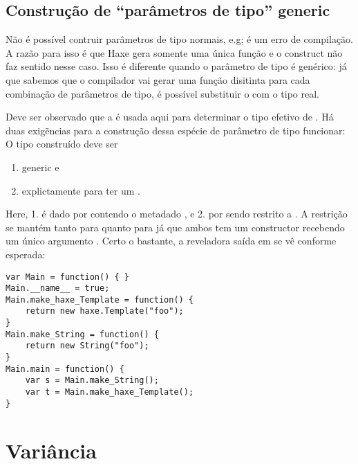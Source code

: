 \subsection{Construção de ``parâmetros de tipo'' generic}
\label{type-system-generic-type-parameter-construction}


Não é possível contruir parâmetros de tipo normais, e.g;  é um erro de compilação. A razão para isso é que Haxe gera somente uma única função e o construct não faz sentido nesse caso. Isso é diferente quando o parâmetro de tipo é genérico: já que sabemos que o compilador vai gerar uma função disitinta para cada combinação de parâmetros de tipo, é possível substituir o   com o tipo real.


Deve ser observado que a  é usada aqui para determinar o tipo efetivo de . Há duas exigẽncias para a construção dessa espécie de parâmetro de tipo funcionar: O tipo construído deve ser

\begin{enumerate}
	\item generic e 
	\item explictamente  para ter um .
\end{enumerate}

Here, 1. é dado por  contendo o metadado , e 2. por  sendo restrito a . A restrição se mantém tanto para  quanto para  já que ambos tem um constructor recebendo um único argumento . Certo o bastante, a reveladora saída em   se vê conforme esperada:

\begin{lstlisting}
var Main = function() { }
Main.__name__ = true;
Main.make_haxe_Template = function() {
	return new haxe.Template("foo");
}
Main.make_String = function() {
	return new String("foo");
}
Main.main = function() {
	var s = Main.make_String();
	var t = Main.make_haxe_Template();
}
\end{lstlisting}

\section{Variância}
\label{type-system-variance}

